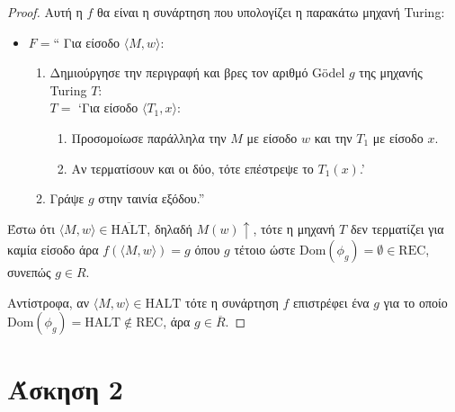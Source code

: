 \documentclass[a4paper, oneside, 11pt]{article}
\theoremstyle{definition}
\begin{document}
\begin{itemize}
\begin{proof}
            Αυτή η $f$ θα είναι η συνάρτηση που υπολογίζει η παρακάτω μηχανή Turing:

            \begin{itemize}
               \item $F = $`` Για είσοδο $\langle M, w \rangle$:
               \begin{enumerate}
               \item Δημιούργησε την περιγραφή και βρες
                     τον αριθμό G\"{o}del $g$ της μηχανής Turing $T$:\\
                     $T = $ `Για είσοδο $\langle T_1, x \rangle$:
                     \begin{enumerate}
                     \item Προσομοίωσε παράλληλα την $M$ με είσοδο $w$ και
                           την $T_1$ με είσοδο $x$.
                     \item Αν τερματίσουν και οι δύο, τότε επέστρεψε το $T_1(x)$.'
                     \end{enumerate}
               \item Γράψε $g$ στην ταινία εξόδου.''
               \end{enumerate}
            \end{itemize}

            Έστω ότι $\langle M, w \rangle \in \overline{\text{HALT}}$, δηλαδή $M(w)
            \uparrow$, τότε η μηχανή $T$ δεν τερματίζει για καμία είσοδο άρα
            $f(\langle M, w \rangle) = g$ όπου $g$ τέτοιο ώστε $\text{Dom}(\phi_g) =
            \emptyset \in \text{REC}$, συνεπώς $g \in R$.

            Αντίστροφα, αν $\langle M, w \rangle \in \text{HALT}$ τότε η συνάρτηση $f$
            επιστρέφει ένα $g$ για το οποίο $\text{Dom}(\phi_g) = \text{HALT} \notin
            \text{REC}$, άρα $g \in \overline{R}$.
         \end{proof}
         
\end{itemize}

\section*{Άσκηση 2}
\end{document}

